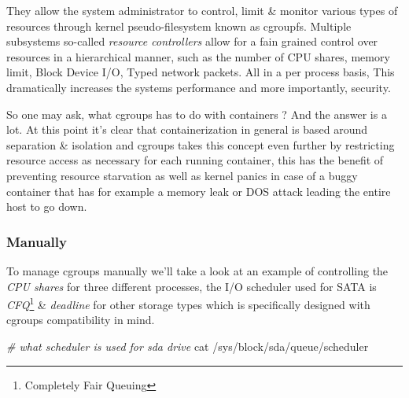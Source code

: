 \documentclass[
  14pt,
  english,
  a4paper,
]{scrreprt}
\newenvironment{Shaded}{}{}
\newcommand{\CommentTok}[1]{\textcolor[rgb]{0.38,0.63,0.69}{\textit{#1}}}
\newcommand{\FunctionTok}[1]{\textcolor[rgb]{0.02,0.16,0.49}{#1}}
\newcommand{\NormalTok}[1]{#1}
\begin{document}
They allow the system administrator to control, limit \& monitor various
types of resources through kernel pseudo-filesystem known as cgroupfs.
Multiple subsystems so-called \emph{resource controllers} allow for a
fain grained control over resources in a hierarchical manner, such as
the number of CPU shares, memory limit, Block Device I/O, Typed network
packets. All in a per process basis, This dramatically increases the
systems performance and more importantly, security.

So one may ask, what cgroups has to do with containers ? And the answer
is a lot. At this point it's clear that containerization in general is
based around separation \& isolation and cgroups takes this concept even
further by restricting resource access as necessary for each running
container, this has the benefit of preventing resource starvation as
well as kernel panics in case of a buggy container that has for example
a memory leak or DOS attack leading the entire host to go down.

\hypertarget{manually}{%
\subsubsection{Manually}\label{manually}}

To manage cgroups manually we'll take a look at an example of
controlling the \emph{CPU shares} for three different processes, the I/O
scheduler used for SATA is \emph{CFQ}\footnote{Completely Fair Queuing}
\& \emph{deadline} for other storage types which is specifically
designed with cgroups compatibility in mind.

\begin{Shaded}
\begin{Highlighting}[]
\CommentTok{\# what scheduler is used for sda drive}
\FunctionTok{cat}\NormalTok{ /sys/block/sda/queue/scheduler}
\end{Highlighting}
\end{Shaded}
\end{document}
